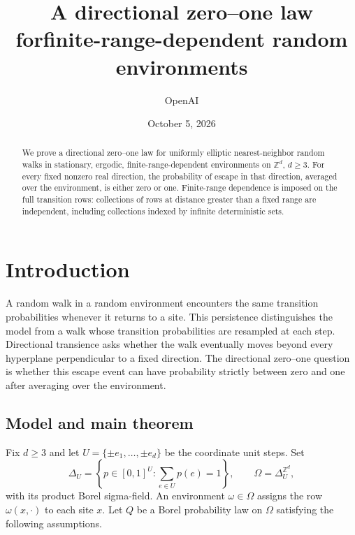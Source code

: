 \documentclass[11pt]{article}
\title{A directional zero--one law for\newline finite-range-dependent random environments}
\author{OpenAI}
\date{October 5, 2026}
\numberwithin{equation}{section}
\theoremstyle{definition}
\theoremstyle{remark}
\newcommand{\ZZ}{\mathbb Z}
\begin{document}
\maketitle
\begin{abstract}
We prove a directional zero--one law for uniformly elliptic nearest-neighbor
random walks in stationary, ergodic, finite-range-dependent environments on
$\ZZ^d$, $d\ge3$. For every fixed nonzero real direction, the probability
of escape in that direction, averaged over the environment, is either zero
or one. Finite-range dependence is imposed on the full transition rows:
collections of rows at distance greater than a fixed range are independent,
including collections indexed by infinite deterministic sets.
\end{abstract}

\section{Introduction}\label{sec:introduction}

A random walk in a random environment encounters the same transition
probabilities whenever it returns to a site. This persistence distinguishes
the model from a walk whose transition probabilities are resampled at each
step. Directional transience asks whether the walk eventually moves beyond
every hyperplane perpendicular to a fixed direction. The directional
zero--one question is whether this escape event can have probability
strictly between zero and one after averaging over the environment.

\subsection{Model and main theorem}

Fix $d\ge3$ and let $U=\{\pm e_1,\ldots,\pm e_d\}$ be the coordinate
unit steps. Set
\[
 \Delta_U=\left\{p\in[0,1]^U:\sum_{e\in U}p(e)=1\right\},
 \qquad \Omega=\Delta_U^{\ZZ^d},
\]
with its product Borel sigma-field. An environment $\omega\in\Omega$
assigns the row $\omega(x,\cdot)$ to each site $x$. Let $Q$ be a Borel
probability law on $\Omega$ satisfying the following assumptions.
\end{document}
